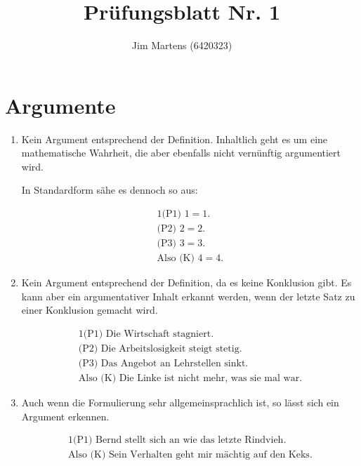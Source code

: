 \documentclass[10pt,a4paper,oneside,ngerman,numbers=noenddot]{scrartcl}
\def\thesection{\arabic{section}.}
\begin{document}
\author{Jim Martens (6420323)}
\title{Prüfungsblatt Nr. 1}
\maketitle

\section{Argumente} %

\begin{enumerate}[label=\thesection\arabic*]
    \item

Kein Argument entsprechend der Definition. Inhaltlich geht es um eine
mathematische Wahrheit, die aber ebenfalls nicht vernünftig argumentiert
wird.

In Standardform sähe es dennoch so aus:

\begin{alignat*}{1}
    \text{(P1) } 1=1. \\
    \text{(P2) } 2=2. \\
    \text{(P3) } 3=3. \\
    \hline
    \text{Also (K) } 4=4.
\end{alignat*}

    \item

Kein Argument entsprechend der Definition, da es keine Konklusion gibt. Es kann
aber ein argumentativer Inhalt erkannt werden, wenn der letzte Satz zu einer
Konklusion gemacht wird.

\begin{alignat*}{1}
    \text{(P1) Die Wirtschaft stagniert.} \\
    \text{(P2) Die Arbeitslosigkeit steigt stetig.} \\
    \text{(P3) Das Angebot an Lehrstellen sinkt.} \\
    \hline
    \text{Also (K) Die Linke ist nicht mehr, was sie mal war.}
\end{alignat*}

    \item


Auch wenn die Formulierung sehr allgemeinsprachlich ist, so lässt sich ein
Argument erkennen.

\begin{alignat*}{1}
    \text{(P1) Bernd stellt sich an wie das letzte Rindvieh.} \\
    \hline
    \text{Also (K) Sein Verhalten geht mir mächtig auf den Keks.}
\end{alignat*}


\end{enumerate}
\end{document}
